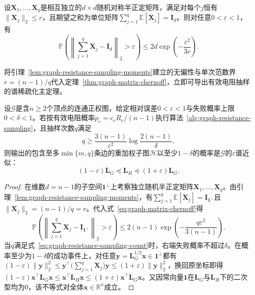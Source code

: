 \begin{theorem}[矩阵Chernoff界的单位均值形式]
\label{thm:graph-matrix-chernoff}
设$\bm X_1,\ldots,\bm X_q$是相互独立的$d\times d$随机对称半正定矩阵，满足对每个$j$恒有$\lVert\bm X_j\rVert_2\leq r$，且期望之和为单位矩阵$\sum_{j=1}^q\mathbb E[\bm X_j]=\bm I_d$。则对任意$0<\varepsilon<1$，有
\begin{equation}
\mathbb P\!\left(
  \left\lVert\sum_{j=1}^q\bm X_j-\bm I_d\right\rVert_2>\varepsilon
\right)
\leq 2d\exp\!\left(-\frac{\varepsilon^2}{3r}\right).
\label{eq:graph-matrix-chernoff}
\end{equation}
\end{theorem}

将引理~\ref{lem:graph-resistance-sampling-moments}建立的无偏性与单次范数界$r=(n-1)/q$代入定理~\ref{thm:graph-matrix-chernoff}，立即可导出有效电阻抽样的谱稀疏化主定理。

\begin{theorem}[有效电阻抽样的谱稀疏化保证]
\label{thm:graph-resistance-sparsification}
设$\mathcal G$是含$n\geq 2$个顶点的连通正权图，给定相对误差$0<\varepsilon<1$与失败概率上限$0<\delta<1$。若按有效电阻概率$p_e=c_eR_e/(n-1)$执行算法~\ref{alg:graph-resistance-sampling}，且抽样次数$q$满足
\begin{equation}
q\geq\frac{3(n-1)}{\varepsilon^2}
         \log\frac{2(n-1)}{\delta},
\label{eq:graph-resistance-sampling-count}
\end{equation}
则输出的包含至多$\min\{m,q\}$条边的重加权子图$\mathcal H$以至少$1-\delta$的概率是$\mathcal G$的$\varepsilon$谱近似：
\[
  (1-\varepsilon)\bm L_G\preceq\bm L_H\preceq(1+\varepsilon)\bm L_G.
\]
\end{theorem}

\begin{proof}
在维数$d=n-1$的子空间$\bm 1^\perp$上考察独立随机半正定矩阵$\bm X_1,\ldots,\bm X_q$。由引理~\ref{lem:graph-resistance-sampling-moments}，有$\sum_{j=1}^q\mathbb E[\bm X_j]=\bm I_{\bm 1^\perp}$且$\lVert\bm X_j\rVert_2=(n-1)/q=r$。代入式~\eqref{eq:graph-matrix-chernoff}得
\[
\mathbb P\!\left(
  \left\lVert\sum_{j=1}^q\bm X_j-\bm I_{\bm 1^\perp}\right\rVert_2>\varepsilon
\right)
\leq 2(n-1)\exp\!\left(-\frac{q\varepsilon^2}{3(n-1)}\right).
\]
当$q$满足式~\eqref{eq:graph-resistance-sampling-count}时，右端失败概率不超过$\delta$。在概率至少为$1-\delta$的成功事件上，对任意$\bm y=\bm L_G^{1/2}\bm x\in\bm 1^\perp$都有$(1-\varepsilon)\lVert\bm y\rVert_2^2\leq\bm y^\top\bigl(\sum_{j=1}^q\bm X_j\bigr)\bm y\leq(1+\varepsilon)\lVert\bm y\rVert_2^2$，换回原坐标即得$(1-\varepsilon)\bm x^\top\bm L_G\bm x\leq\bm x^\top\bm L_H\bm x\leq(1+\varepsilon)\bm x^\top\bm L_G\bm x$。又因常向量$\bm 1$在$\bm L_G$与$\bm L_H$下的二次型均为$0$，该不等式对全体$\bm x\in\mathbb R^n$成立。
\end{proof}

